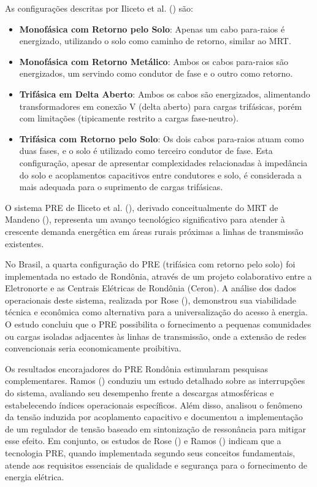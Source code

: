 \documentclass[oneside,openright,12pt]{ufsm_2021} %
\begin{document}
\par As configurações descritas por Iliceto et al. (\citeyear{iliceto_new_1989}) são:
\begin{itemize}
	\item \textbf{Monofásica com Retorno pelo Solo}: Apenas um cabo para-raios é energizado, utilizando o solo como caminho de retorno, similar ao MRT.
	\item \textbf{Monofásica com Retorno Metálico}: Ambos os cabos para-raios são energizados, um servindo como condutor de fase e o outro como retorno.
	\item \textbf{Trifásica em Delta Aberto}: Ambos os cabos são energizados, alimentando transformadores em conexão V (delta aberto) para cargas trifásicas, porém com limitações (tipicamente restrito a cargas fase-neutro).
	\item \textbf{Trifásica com Retorno pelo Solo}: Os dois cabos para-raios atuam como duas fases, e o solo é utilizado como terceiro condutor de fase. Esta configuração, apesar de apresentar complexidades relacionadas à impedância do solo e acoplamentos capacitivos entre condutores e solo, é considerada a mais adequada para o suprimento de cargas trifásicas.
\end{itemize}

\par O sistema PRE de Iliceto et al. (\citeyear{iliceto_new_1989}), derivado conceitualmente do MRT de Mandeno (\citeyear{mandeno_rural_1947}), representa um avanço tecnológico significativo para atender à crescente demanda energética em áreas rurais próximas a linhas de transmissão existentes.

\par No Brasil, a quarta configuração do PRE (trifásica com retorno pelo solo) foi implementada no estado de Rondônia, através de um projeto colaborativo entre a Eletronorte e as Centrais Elétricas de Rondônia (Ceron). A análise dos dados operacionais deste sistema, realizada por Rose (\citeyear{rose_alimentacao_1997}), demonstrou sua viabilidade técnica e econômica como alternativa para a universalização do acesso à energia. O estudo concluiu que o PRE possibilita o fornecimento a pequenas comunidades ou cargas isoladas adjacentes às linhas de transmissão, onde a extensão de redes convencionais seria economicamente proibitiva.

\par Os resultados encorajadores do PRE Rondônia estimularam pesquisas complementares. Ramos (\citeyear{ramos_universalizacao_2010}) conduziu um estudo detalhado sobre as interrupções do sistema, avaliando seu desempenho frente a descargas atmosféricas e estabelecendo índices operacionais específicos. Além disso, analisou o fenômeno da tensão induzida por acoplamento capacitivo e documentou a implementação de um regulador de tensão baseado em sintonização de ressonância para mitigar esse efeito. Em conjunto, os estudos de Rose (\citeyear{rose_alimentacao_1997}) e Ramos (\citeyear{ramos_universalizacao_2010}) indicam que a tecnologia PRE, quando implementada segundo seus conceitos fundamentais, atende aos requisitos essenciais de qualidade e segurança para o fornecimento de energia elétrica.
\end{document}
